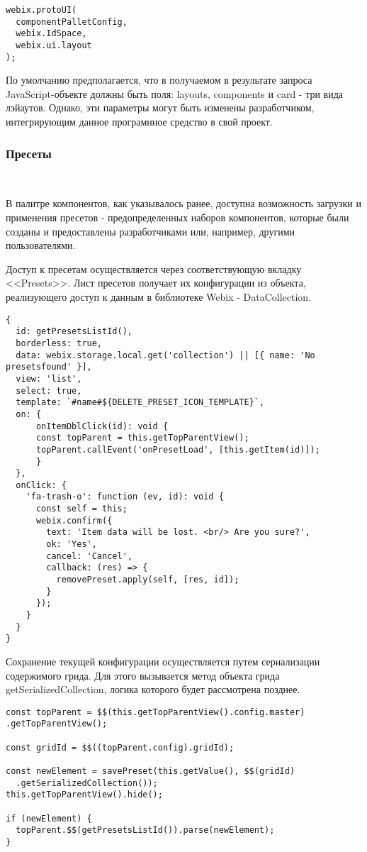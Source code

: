 \begin{lstlisting}
webix.protoUI(
  componentPalletConfig,
  webix.IdSpace,
  webix.ui.layout
);
\end{lstlisting}

По умолчанию предполагается, что в получаемом в результате запроса JavaScript-объекте должны быть поля: layouts, components и card - три вида лэйаутов. Однако, эти параметры могут быть изменены разработчиком, интегрирующим данное програмнное средство в свой проект.

\subsubsection{Пресеты}
\

В палитре компонентов, как указывалось ранее, доступна возможность загрузки и применения пресетов - предопределенных наборов компонентов, которые были созданы и предоставлены разработчиками или, например, другими пользователями.

Доступ к пресетам осуществляется через соответствующую вкладку <<Presets>>. Лист пресетов получает их конфигурации из объекта, реализующего доступ к данным в библиотеке Webix - DataCollection.

\begin{lstlisting}
{
  id: getPresetsListId(),
  borderless: true,
  data: webix.storage.local.get('collection') || [{ name: 'No presetsfound' }],
  view: 'list',
  select: true,
  template: `#name#${DELETE_PRESET_ICON_TEMPLATE}`,
  on: {
      onItemDblClick(id): void {
      const topParent = this.getTopParentView();
      topParent.callEvent('onPresetLoad', [this.getItem(id)]);
      }
  },
  onClick: {
    'fa-trash-o': function (ev, id): void {
      const self = this;
      webix.confirm({
        text: 'Item data will be lost. <br/> Are you sure?',
        ok: 'Yes',
        cancel: 'Cancel',
        callback: (res) => {
          removePreset.apply(self, [res, id]);
        }
      });
    }
  }
}
\end{lstlisting}

Сохранение текущей конфигурации осуществляется путем сериализации содержимого грида. Для этого вызывается метод объекта грида getSerializedCollection, логика которого будет рассмотрена позднее.

\begin{lstlisting}
const topParent = $$(this.getTopParentView().config.master)
.getTopParentView();

const gridId = $$((topParent.config).gridId);

const newElement = savePreset(this.getValue(), $$(gridId)
  .getSerializedCollection());
this.getTopParentView().hide();

if (newElement) {
  topParent.$$(getPresetsListId()).parse(newElement);
}
\end{lstlisting}

